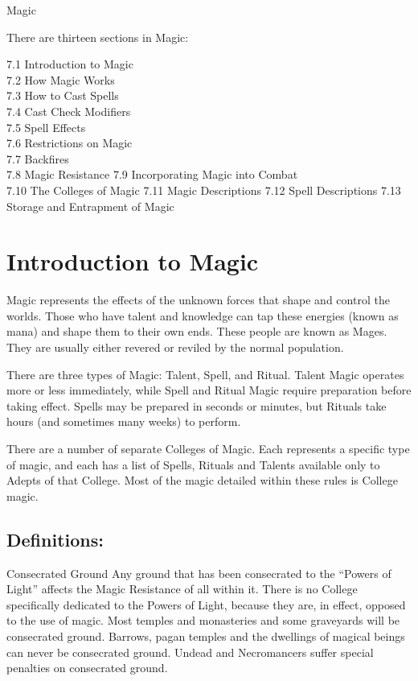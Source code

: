\begin{Chapter}{Magic}

There are thirteen sections in Magic: 


7.1 Introduction to Magic \\
7.2 How Magic Works \\
7.3 How to Cast Spells \\
7.4 Cast Check Modifiers \\
7.5 Spell Effects \\
7.6 Restrictions on Magic \\
7.7 Backfires \\
7.8  Magic Resistance 
7.9 Incorporating Magic into Combat \\
7.10  The Colleges of Magic 
7.11  Magic Descriptions 
7.12  Spell Descriptions 
7.13  Storage and Entrapment of Magic 


\section{Introduction to Magic}

Magic represents the effects of the unknown forces that shape and
control the worlds. Those who have talent and knowledge can tap these
energies (known as mana) and shape them to their own ends. These
people are known as Mages. They are usually either revered or reviled
by the normal population.

There are three types of Magic: Talent, Spell, and Ritual.  Talent
Magic operates more or less immediately, while Spell and Ritual Magic
require preparation before taking effect.  Spells may be prepared in
seconds or minutes, but Rituals take hours (and sometimes many weeks)
to perform.

There are a number of separate Colleges of Magic.  Each represents a
specific type of magic, and each has a list of Spells, Rituals and
Talents available only to Adepts of that College. Most of the magic
detailed within these rules is College magic.

\subsection{Definitions:}

\begin{Description}

\item[Consecrated Ground] Any ground that has been consecrated to the
  “Powers of Light” affects the Magic Resistance of all within
  it. There is no College specifically dedicated to the Powers of
  Light, because they are, in effect, opposed to the use of magic.
  Most temples and monasteries and some graveyards will be consecrated
  ground.  Barrows, pagan temples and the dwellings of magical beings
  can never be consecrated ground.  Undead and Necromancers suffer
  special penalties on consecrated ground.


\end{Description}
\end{Chapter}
